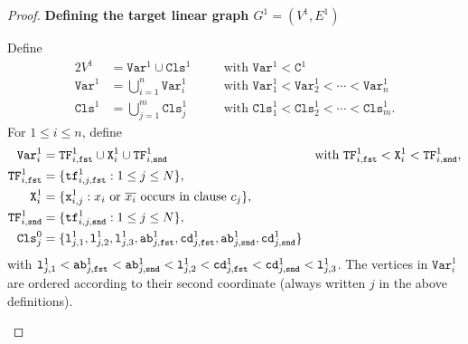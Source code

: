 \begin{proof}
  \medskip
  \textbf{Defining the target linear graph $G^{1} = (V^{1}, E^{1})$}
  \medskip
  \begin{mdframed}
    Define
    \begin{alignat*} {2}
      V^{1} &= \texttt{Var}^{1} \cup \texttt{Cls}^{1}
      &\quad&\text{with $\texttt{Var}^{1} < \texttt{C}^{1}$}
      \\
      \texttt{Var}^{1} &= \bigcup_{i=1}^{n} \texttt{Var}^{1}_{i}
      &&\text{with $\texttt{Var}^{1}_1 < \texttt{Var}^{1}_2 < \cdots < \texttt{Var}^{1}_n$}
      \\
      \texttt{Cls}^{1} &= \bigcup_{j=1}^{m} \texttt{Cls}^{1}_{j}
      &&\text{with $\texttt{Cls}^{1}_1 < \texttt{Cls}^{1}_2 < \cdots < \texttt{Cls}^{1}_m$.}
    \end{alignat*}
    For $1 \leq i \leq n$, define
    \begin{alignat*}{2}
      \texttt{Var}^{1}_{i} &=
      \texttt{TF}^{1}_{i,\texttt{fst}} \cup \texttt{X}^{1}_{i} \cup \texttt{TF}^{1}_{i,\texttt{snd}}
      &&\text{with $\texttt{TF}^{1}_{i,\texttt{fst}} < \texttt{X}^{1}_{i} < \texttt{TF}^{1}_{i,\texttt{snd}}$},
      \\
      \texttt{TF}^{1}_{i,\texttt{fst}}
      &=
      \{\texttt{tf}^{1}_{i,j,\texttt{fst}} : 1 \leq j \leq N\},
      &&
      \\
      \texttt{X}^{1}_{i}
      &=
      \{\texttt{x}^{1}_{i,j} : \text{$x_{i}$ or $\overline{x_{i}}$ occurs in clause $c_{j}$}\},
      &&
      \\
      \texttt{TF}^{1}_{i,\texttt{snd}}
      &=
      \{\texttt{tf}^{1}_{i,j,\texttt{snd}} : 1 \leq j \leq N\},
      &&
      \\
      \texttt{Cls}^{0}_{j}
      &=
      \{
      \texttt{l}^{1}_{j,1},
      \texttt{l}^{1}_{j,2},
      \texttt{l}^{1}_{j,3},
      \texttt{ab}^{1}_{j,\texttt{fst}},
      \texttt{cd}^{1}_{j,\texttt{fst}},
      \texttt{ab}^{1}_{j,\texttt{snd}},
      \texttt{cd}^{1}_{j,\texttt{snd}}
      \}
      &&
    \end{alignat*}
    with
    $
    \texttt{l}^{1}_{j,1} <
    \texttt{ab}^{1}_{j,\texttt{fst}} <
    \texttt{ab}^{1}_{j,\texttt{snd}} <
    \texttt{l}^{1}_{j,2} <
    \texttt{cd}^{1}_{j,\texttt{fst}} <
    \texttt{cd}^{1}_{j,\texttt{snd}} <
    \texttt{l}^{1}_{j,3}
    $.
    The vertices in $\texttt{Var}^{1}_{i}$ are ordered according to their second coordinate
    (always written $j$ in the above definitions).


\end{mdframed}
\end{proof}
